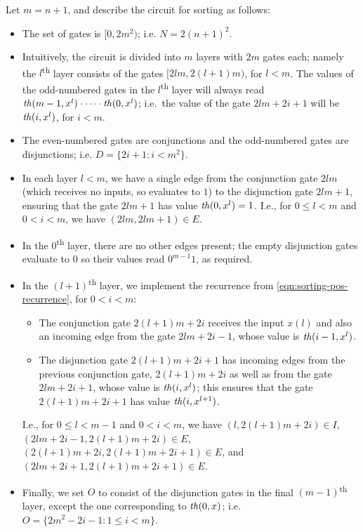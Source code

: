 \documentclass{lmcs}
\begin{document}
Let $m = n+1$, and describe the circuit for sorting as follows:
\begin{itemize}
	\item The set of gates is $[0, 2m^2)$; i.e. $N = 2(n+1)^2$.
	\item Intuitively, the circuit is divided into $m$ layers with $2m$ gates each; namely the $l$\textsuperscript{th} layer consists of the gates $[2lm, 2(l+1)m)$, for $l<m$. 
	The values of the odd-numbered gates in the $l$\textsuperscript{th} layer will always read $\mathit{th}(m-1,x^l) \cdot \cdots \cdot \mathit{th}(0 , x^l)$; i.e.\ the value of the gate $2lm + 2i + 1$ will be $\mathit{th}(i,x^l)$, for $i < m$.
	\item The even-numbered gates are conjunctions and the odd-numbered gates are disjunctions; i.e. $D = \{ 2i+1 : i < m^2 \}$.
	\item In each layer $l<m$, we have a single edge from the conjunction gate $2lm$ (which receives no inputs, so evaluates to $1$) to the disjunction gate $2lm+1$, ensuring that the gate $2lm+1$ has value $\mathit{th} (0,x^l) =1$. I.e., for $0\leq l<m$ and $0<i<m$, we have $( 2lm, 2lm+1 ) \in E$.
	\item In the $0$\textsuperscript{th} layer, there are no other edges present; the empty disjunction gates evaluate to $0$ so their values read $0^{m-1}1$, as required.
	\item In the $(l+1)$\textsuperscript{th} layer, we implement the recurrence from \eqref{eqn:sorting-pos-recurrence}, for $0< i < m$: 
	\begin{itemize}
		\item The conjunction gate $2(l+1)m + 2i$ receives the input $x(l)$ and also an incoming edge from the gate $2lm + 2i-1$, whose value is $\mathit{th} (i-1, x^l)$.
		\item The disjunction gate $2(l+1)m + 2i + 1$ has incoming edges from the previous conjunction gate, $2(l+1)m + 2i$ as well as from the gate $2lm +2i + 1$, whose value is $\mathit{th} (i, x^l)$; this ensures that the gate $2(l+1)m+2i+1$ has value $\mathit{th} (i, x^{l+1}) $. 
	\end{itemize}
	I.e., for $0\leq l<m-1$ and $0<i<m$, we have $(l,2(l+1)m+2i) \in I $, $(2lm+2i-1,2(l+1)m + 2i) \in E$, $(2(l+1)m + 2i, 2(l+1)m + 2i + 1  ) \in E$, and $(2lm + 2i + 1, 2(l+1)m + 2i +1) \in E$.
	\item Finally, we set $O$ to consist of the disjunction gates in the final $(m-1)$\textsuperscript{th} layer, except the one corresponding to $\mathit{th}(0,x)$; i.e.\ $O = \{2m^2 -2i - 1 : 1\leq i< m \}$.
\end{itemize}
\end{document}
